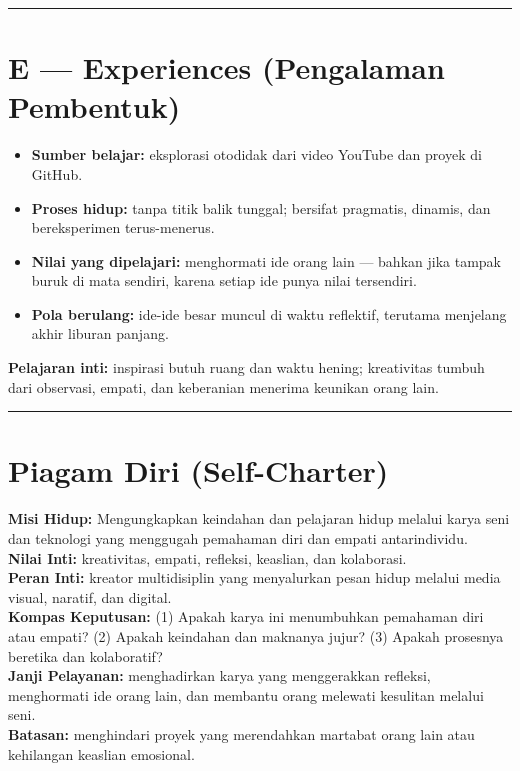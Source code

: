 \documentclass[
  letterpaper,
  DIV=11,
  numbers=noendperiod]{scrreprt}
\providecommand{\tightlist}{%
  \setlength{\itemsep}{0pt}\setlength{\parskip}{0pt}}
\begin{document}
\begin{center}\rule{0.5\linewidth}{0.5pt}\end{center}

\section{E --- Experiences (Pengalaman
Pembentuk)}\label{e-experiences-pengalaman-pembentuk}

\begin{itemize}
\tightlist
\item
  \textbf{Sumber belajar:} eksplorasi otodidak dari video YouTube dan
  proyek di GitHub.\\
\item
  \textbf{Proses hidup:} tanpa titik balik tunggal; bersifat pragmatis,
  dinamis, dan bereksperimen terus-menerus.\\
\item
  \textbf{Nilai yang dipelajari:} menghormati ide orang lain --- bahkan
  jika tampak buruk di mata sendiri, karena setiap ide punya nilai
  tersendiri.\\
\item
  \textbf{Pola berulang:} ide-ide besar muncul di waktu reflektif,
  terutama menjelang akhir liburan panjang.
\end{itemize}

\textbf{Pelajaran inti:} inspirasi butuh ruang dan waktu hening;
kreativitas tumbuh dari observasi, empati, dan keberanian menerima
keunikan orang lain.

\begin{center}\rule{0.5\linewidth}{0.5pt}\end{center}

\section{Piagam Diri (Self-Charter)}\label{piagam-diri-self-charter}

\textbf{Misi Hidup:} Mengungkapkan keindahan dan pelajaran hidup melalui
karya seni dan teknologi yang menggugah pemahaman diri dan empati
antarindividu.\\
\textbf{Nilai Inti:} kreativitas, empati, refleksi, keaslian, dan
kolaborasi.\\
\textbf{Peran Inti:} kreator multidisiplin yang menyalurkan pesan hidup
melalui media visual, naratif, dan digital.\\
\textbf{Kompas Keputusan:} (1) Apakah karya ini menumbuhkan pemahaman
diri atau empati? (2) Apakah keindahan dan maknanya jujur? (3) Apakah
prosesnya beretika dan kolaboratif?\\
\textbf{Janji Pelayanan:} menghadirkan karya yang menggerakkan refleksi,
menghormati ide orang lain, dan membantu orang melewati kesulitan
melalui seni.\\
\textbf{Batasan:} menghindari proyek yang merendahkan martabat orang
lain atau kehilangan keaslian emosional.
\end{document}
